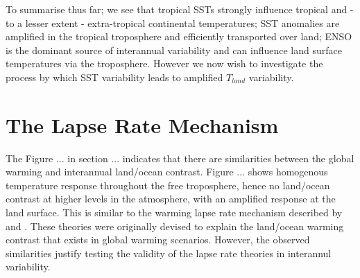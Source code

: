 To summarise thus far; we see that tropical SSTs strongly influence tropical and 
- to a lesser extent - extra-tropical continental temperatures; SST anomalies 
are amplified in the tropical troposphere and efficiently transported over land; 
ENSO is the dominant source of interannual variability and can influence land 
surface temperatures via the troposphere. However we now wish to investigate the 
process by which SST variability leads to amplified $T_{land}$ variability.  



\clearpage

\section{The Lapse Rate Mechanism}

The Figure ... in section ... indicates that there are similarities between the 
global warming and interannual land/ocean contrast.  Figure ...  shows 
homogenous temperature response throughout the free troposphere, hence no 
land/ocean contrast at higher levels in the atmosphere, with an amplified 
response at the land surface.  This is similar to the warming lapse rate 
mechanism described by \citet{Joshi2007} and \citet{Byrne2013a}.  These theories 
were originally devised to explain the land/ocean warming contrast that exists 
in global warming scenarios. However, the observed similarities justify testing 
the validity of the lapse rate theories in interannul variability.

